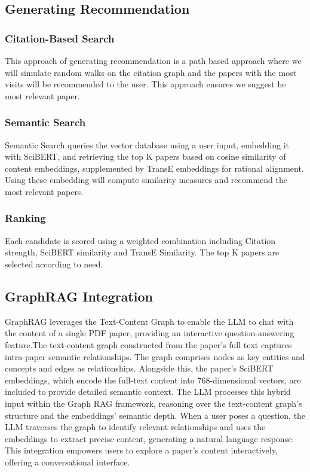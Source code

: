 \documentclass[a4paper,12pt]{article}
\begin{document}
\subsection{Generating Recommendation}
\subsubsection{Citation-Based Search}
This approach of generating recommendation is a path based approach where we will
simulate random walks on the citation graph and the papers with the most visits will
be recommended to the user. This approach ensures we suggest he most relevant paper.

\subsubsection{Semantic Search}
Semantic Search queries the vector database using a user input, embedding it with
SciBERT, and retrieving the top K papers based on cosine similarity of content
embeddings, supplemented by TransE embeddings for rational alignment. Using these
embedding will compute similarity measures and recommend the most relevant papers.

\subsubsection{Ranking}
Each candidate is scored using a weighted combination including Citation strength,
SciBERT similarity and TransE Similarity. The top K papers are selected according
to need.

\subsection{GraphRAG Integration}
GraphRAG leverages the Text-Content Graph to enable the LLM to chat with the content of a single PDF paper, providing an interactive question-answering feature.The text-content graph constructed from the paper’s full text captures intra-paper semantic relationships. The graph comprises nodes as key entities and concepts and edges as relationships. Alongside this, the paper’s SciBERT embeddings, which encode the full-text content into 768-dimensional vectors, are included to provide detailed semantic context. The LLM processes this hybrid input within the Graph RAG framework, reasoning over the text-content graph’s structure and the embeddings’ semantic depth. When a user poses a question, the LLM traverses the graph to identify relevant relationships and uses the embeddings to extract precise content, generating a natural language response. This integration empowers users to explore a paper’s content interactively, offering a conversational interface.
\newpage
\end{document}
